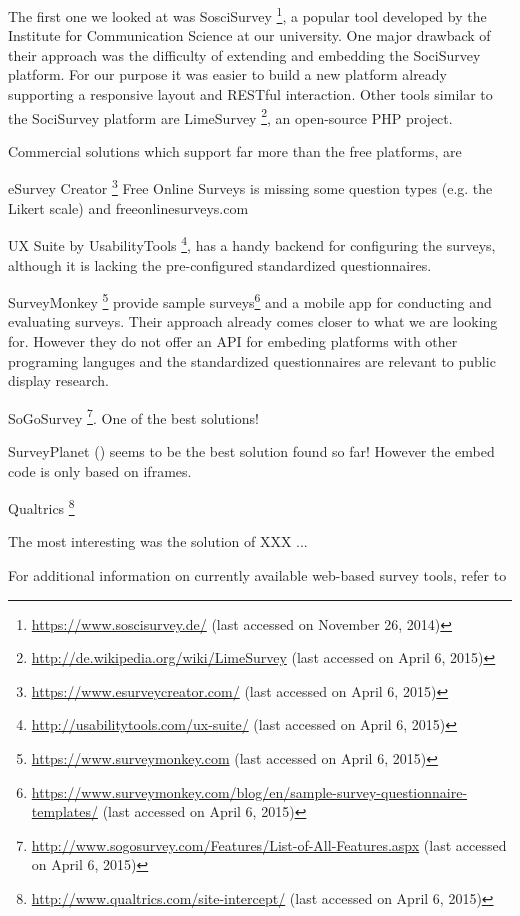	The first one we looked at was SosciSurvey \footnote{\url{https://www.soscisurvey.de/} (last accessed on November 26, 2014)}, a popular tool developed by the Institute for Communication Science at our university. One major drawback of their approach was the difficulty of extending and embedding the SociSurvey platform. For our purpose it was easier to build a new platform already supporting a responsive layout and RESTful interaction. Other tools similar to the SociSurvey platform are LimeSurvey \footnote{\url{http://de.wikipedia.org/wiki/LimeSurvey} (last accessed on April 6, 2015)}, an open-source PHP project.

	Commercial solutions which support far more than the free platforms, are 
	
		eSurvey Creator \footnote{\url{https://www.esurveycreator.com/} (last accessed on April 6, 2015)}
		Free Online Surveys is missing some question types (e.g. the Likert scale) and freeonlinesurveys.com

		UX Suite by UsabilityTools \footnote{\url{http://usabilitytools.com/ux-suite/} (last accessed on April 6, 2015)}, has a handy backend for configuring the surveys, although it is lacking the pre-configured standardized questionnaires. 
		

		SurveyMonkey \footnote{\url{https://www.surveymonkey.com} (last accessed on April 6, 2015)} provide sample surveys\footnote{\url{https://www.surveymonkey.com/blog/en/sample-survey-questionnaire-templates/} (last accessed on April 6, 2015)} and a mobile app for conducting and evaluating surveys. Their approach already comes closer to what we are looking for. However they do not offer an API for embeding platforms with other programing languges and the standardized questionnaires are relevant to public display research.

		SoGoSurvey \footnote{\url{http://www.sogosurvey.com/Features/List-of-All-Features.aspx} (last accessed on April 6, 2015)}. One of the best solutions!

		SurveyPlanet () seems to be the best solution found so far! However the embed code is only based on iframes.

		Qualtrics \footnote{\url{http://www.qualtrics.com/site-intercept/} (last accessed on April 6, 2015)}


	The most interesting was the solution of XXX ...

	For additional information on currently available web-based survey tools, refer to \cite{Capterra2015SurveyTools, Idealware2011SurveyTools}






